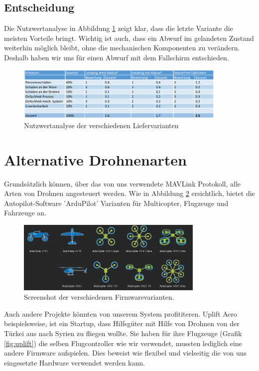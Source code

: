 \subsection{Entscheidung}

Die Nutzwertanalyse in Abbildung \ref{fig:nutzwertanalyse_abwurf} zeigt klar, dass die letzte Variante die meisten Vorteile bringt. Wichtig ist auch, dass ein Abwurf im gelandeten Zustand weiterhin möglich bleibt, ohne die mechanischen Komponenten zu verändern. Deshalb haben wir uns für einen Abwurf mit dem Fallschirm entschieden.

\begin{figure}[h]
	\centering
	\includegraphics[width=0.9\textwidth] {images/nutzwertanalyse_abwurf.png} 
	\caption{Nutzwertanalyse der verschiedenen Liefervarianten}
	\label{fig:nutzwertanalyse_abwurf}
\end{figure}

\section{Alternative Drohnenarten}

Grundsätzlich können, über das von uns verwendete \Gls{MAVLink} Protokoll, alle Arten von Drohnen angesteuert werden. Wie in Abbildung \ref{fig:arduScreenshot} ersichtlich, bietet die Autopilot-Software 'ArduPilot' Varianten für Multicopter, Flugzeuge und Fahrzeuge an.\\
\begin{figure}[H]
\centering
\includegraphics[width=0.8\textwidth] {images/arduScreenshot.jpg}
\caption{Screenshot der verschiedenen Firmwarevarianten.}
\label{fig:arduScreenshot}
\end{figure}

Auch andere Projekte könnten von unserem System profititeren. Uplift Aero beispielsweise, ist ein Startup, dass Hilfsgüter mit Hilfe von Drohnen von der Türkei aus nach Syrien zu fliegen wollte. Sie haben für ihre Flugzeuge (Grafik \ref{fig:uplift}) die selben Flugcontroller wie wir verwendet, mussten lediglich eine andere Firmware aufspielen. Dies beweist wie flexibel und vielseitig die von uns eingesetzte Hardware verwendet werden kann.

